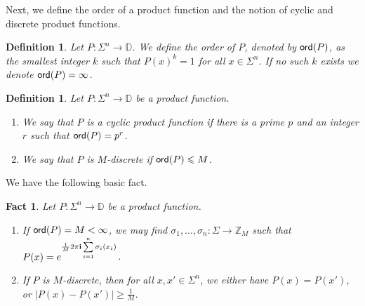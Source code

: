 \documentclass[11pt]{article}
\newtheorem{fact}[thm]{Fact}
\newtheorem{definition}[thm]{Definition}
\newcommand\card[1]{\left| {#1} \right|}
\renewcommand\geq{\geqslant}
\renewcommand\leq{\leqslant}
\begin{document}
Next, we define the order of a product function and the notion of cyclic and discrete product functions.
\begin{definition}
    Let $P\colon \Sigma^{n}\to\mathbb{D}$. We define the order of $P$, denoted by ${\sf ord}(P)$, as the smallest integer $k$ such that $P(x)^{k}= 1$ for all $x\in\Sigma^n$. If no such $k$ exists we denote ${\sf ord}(P) = \infty$.
\end{definition}
\begin{definition}
    Let $P\colon \Sigma^n\to\mathbb{D}$ be a product function.
    \begin{enumerate}
        \item We say that $P$ is a cyclic product function if there is a prime $p$ and an integer $r$ such that ${\sf ord}(P) = p^r$. 
        \item We say that $P$ is $M$-discrete if ${\sf ord}(P)\leq M$.
    \end{enumerate}
\end{definition}
We have the following basic fact.
\begin{fact}\label{fact:triv_disc_cyclic}
    Let $P\colon \Sigma^n\to\mathbb{D}$ be a product function.
    \begin{enumerate}
        \item If ${\sf ord}(P)=M<\infty$, we may find $\sigma_1,\ldots,\sigma_n\colon \Sigma\to \mathbb{Z}_{M}$ such that $P(x) = e^{\frac{1}{M}2\pi{\bf i}\sum\limits_{i=1}^{n}\sigma_i(x_i)}$.
        \item If $P$ is $M$-discrete, then for all $x,x'\in\Sigma^n$, we either have $P(x)=P(x')$, or $\card{P(x)-P(x')}\geq \frac{1}{M}$.
    \end{enumerate}
\end{fact}
\end{document}
